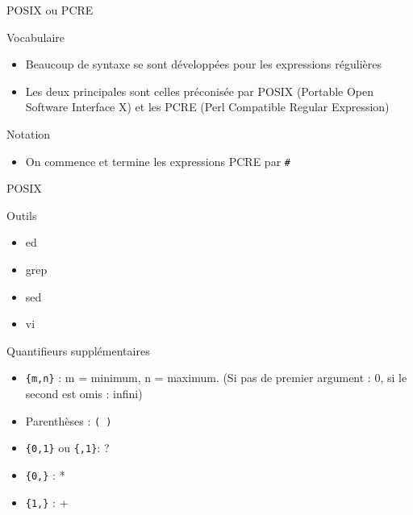 \def\ftitle{POSIX ou PCRE}
\begin{frame}[containsverbatim]{\ftitle}
\def\blocktitle{Vocabulaire}
\begin{block}{\blocktitle}
\begin{itemize}
\item Beaucoup de syntaxe se sont développées pour les expressions régulières
\item Les deux principales sont celles préconisée par POSIX (Portable Open Software Interface X) et les PCRE (Perl Compatible Regular Expression)
\end{itemize}
\end{block}

\def\blocktitle{Notation}
\begin{block}{\blocktitle}
\begin{itemize}
\item On commence et termine les expressions PCRE par \verb!#!
\end{itemize}
\end{block}
\end{frame}

\def\ftitle{POSIX}
\begin{frame}[containsverbatim]{\ftitle}
\def\blocktitle{Outils}
\begin{block}{\blocktitle}
\begin{itemize}
\item ed
\item grep
\item sed
\item vi
\end{itemize}
\end{block}



\def\blocktitle{Quantifieurs supplémentaires}
\begin{block}{\blocktitle}
\begin{itemize}
\item \verb!{m,n}!	: m = minimum, n = maximum. (Si pas de premier argument : 0, si le second est omis : infini)
\item Parenthèses : \verb!( )!
\item \verb!{0,1}! ou \verb!{,1}!: ?
\item \verb!{0,}! : *
\item \verb!{1,}! : +
\end{itemize}
\end{block}
\end{frame}


